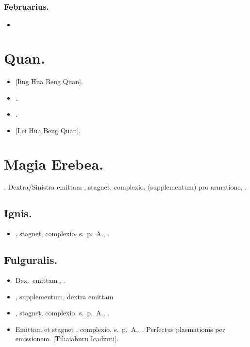 \documentclass[12pt]{book}
\begin{document}
\subsection{Februarius.}\label{februarius}

\begin{itemize}
  \item {}
\end{itemize}


\chapter{Quan.}\label{quan}

\begin{itemize}
  \item {} [Iing Hua Beng Quan].
  \item {} .
  \item {} .
  \item {} [Lei Hua Beng Quan].
\end{itemize}

\chapter{Magia Erebea.}\label{magia-erebea}
.
\noindent
Dextra/Sinistra emittam , stagnet, complexio, (supplementum) pro armatione, .

\section{Ignis.}\label{erebea-ignis}

\begin{itemize}
  \item \textelp{} , stagnet, complexio, s.~p.~A., .
\end{itemize}

\section{Fulguralis.}\label{erebea-fulguralis}

\begin{itemize}
  \item Dex.\ emittam , .
  \item \textelp{} , supplementum, dextra emittam \textelp{}
  \item \textelp{} , stagnet, complexio, s.~p.~A., .
  \item Emittam et stagnet , complexio, s.~p.~A.,
        .
        Perfectus plasmationis per emissionem.
        [Tihaiaburu Icadzuti].
\end{itemize}
\end{document}
